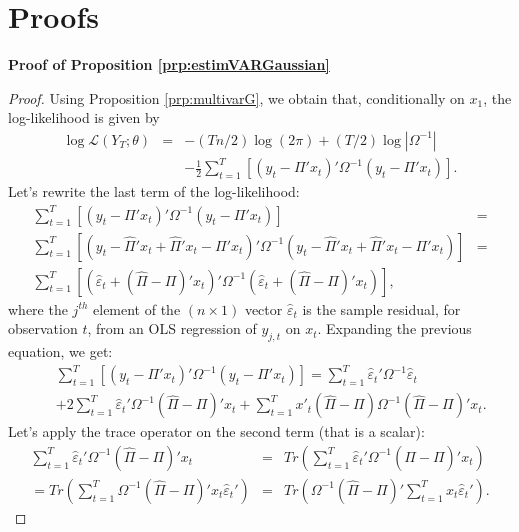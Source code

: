 \documentclass[
  12pt,
]{book}
\theoremstyle{definition}
\theoremstyle{definition}
\theoremstyle{definition}
\theoremstyle{definition}
\theoremstyle{remark}
\begin{document}
\hypertarget{AppendixProof}{%
\section{Proofs}\label{AppendixProof}}

\textbf{Proof of Proposition \ref{prp:estimVARGaussian}}

\begin{proof}
Using Proposition \ref{prp:multivarG}, we obtain that, conditionally on \(x_1\), the log-likelihood is given by
\begin{eqnarray*}
\log\mathcal{L}(Y_{T};\theta) & = & -(Tn/2)\log(2\pi)+(T/2)\log\left|\Omega^{-1}\right|\\
&  & -\frac{1}{2}\sum_{t=1}^{T}\left[\left(y_{t}-\Pi'x_{t}\right)'\Omega^{-1}\left(y_{t}-\Pi'x_{t}\right)\right].
\end{eqnarray*}
Let's rewrite the last term of the log-likelihood:
\begin{eqnarray*}
\sum_{t=1}^{T}\left[\left(y_{t}-\Pi'x_{t}\right)'\Omega^{-1}\left(y_{t}-\Pi'x_{t}\right)\right] & =\\
\sum_{t=1}^{T}\left[\left(y_{t}-\hat{\Pi}'x_{t}+\hat{\Pi}'x_{t}-\Pi'x_{t}\right)'\Omega^{-1}\left(y_{t}-\hat{\Pi}'x_{t}+\hat{\Pi}'x_{t}-\Pi'x_{t}\right)\right] & =\\
\sum_{t=1}^{T}\left[\left(\hat{\varepsilon}_{t}+(\hat{\Pi}-\Pi)'x_{t}\right)'\Omega^{-1}\left(\hat{\varepsilon}_{t}+(\hat{\Pi}-\Pi)'x_{t}\right)\right],
\end{eqnarray*}
where the \(j^{th}\) element of the \((n\times1)\) vector \(\hat{\varepsilon}_{t}\) is the sample residual, for observation \(t\), from an OLS regression of \(y_{j,t}\) on \(x_{t}\). Expanding the previous equation, we get:
\begin{eqnarray*}
&&\sum_{t=1}^{T}\left[\left(y_{t}-\Pi'x_{t}\right)'\Omega^{-1}\left(y_{t}-\Pi'x_{t}\right)\right]  = \sum_{t=1}^{T}\hat{\varepsilon}_{t}'\Omega^{-1}\hat{\varepsilon}_{t}\\
&&+2\sum_{t=1}^{T}\hat{\varepsilon}_{t}'\Omega^{-1}(\hat{\Pi}-\Pi)'x_{t}+\sum_{t=1}^{T}x'_{t}(\hat{\Pi}-\Pi)\Omega^{-1}(\hat{\Pi}-\Pi)'x_{t}.
\end{eqnarray*}
Let's apply the trace operator on the second term (that is a scalar):
\begin{eqnarray*}
\sum_{t=1}^{T}\hat{\varepsilon}_{t}'\Omega^{-1}(\hat{\Pi}-\Pi)'x_{t} & = & Tr\left(\sum_{t=1}^{T}\hat{\varepsilon}_{t}'\Omega^{-1}(\hat{\Pi}-\Pi)'x_{t}\right)\\
=  Tr\left(\sum_{t=1}^{T}\Omega^{-1}(\hat{\Pi}-\Pi)'x_{t}\hat{\varepsilon}_{t}'\right) & = & Tr\left(\Omega^{-1}(\hat{\Pi}-\Pi)'\sum_{t=1}^{T}x_{t}\hat{\varepsilon}_{t}'\right).

\end{eqnarray*}
\end{proof}
\end{document}
